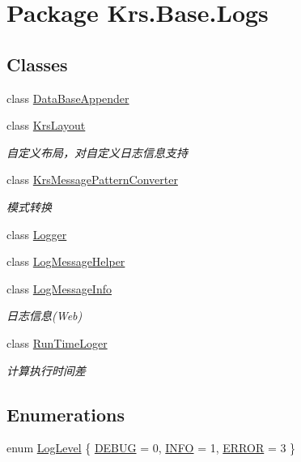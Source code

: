 \hypertarget{namespace_krs_1_1_base_1_1_logs}{\section{Package Krs.\-Base.\-Logs}
\label{namespace_krs_1_1_base_1_1_logs}
}
\subsection*{Classes}
\begin{DoxyCompactItemize}
\item 
class \hyperlink{class_krs_1_1_base_1_1_logs_1_1_data_base_appender}{Data\-Base\-Appender}
\item 
class \hyperlink{class_krs_1_1_base_1_1_logs_1_1_krs_layout}{Krs\-Layout}
\begin{DoxyCompactList}\small\item\em 自定义布局，对自定义日志信息支持 \end{DoxyCompactList}\item 
class \hyperlink{class_krs_1_1_base_1_1_logs_1_1_krs_message_pattern_converter}{Krs\-Message\-Pattern\-Converter}
\begin{DoxyCompactList}\small\item\em 模式转换 \end{DoxyCompactList}\item 
class \hyperlink{class_krs_1_1_base_1_1_logs_1_1_logger}{Logger}
\item 
class \hyperlink{class_krs_1_1_base_1_1_logs_1_1_log_message_helper}{Log\-Message\-Helper}
\item 
class \hyperlink{class_krs_1_1_base_1_1_logs_1_1_log_message_info}{Log\-Message\-Info}
\begin{DoxyCompactList}\small\item\em 日志信息(\-Web) \end{DoxyCompactList}\item 
class \hyperlink{class_krs_1_1_base_1_1_logs_1_1_run_time_loger}{Run\-Time\-Loger}
\begin{DoxyCompactList}\small\item\em 计算执行时间差 \end{DoxyCompactList}\end{DoxyCompactItemize}
\subsection*{Enumerations}
\begin{DoxyCompactItemize}
\item 
enum \hyperlink{namespace_krs_1_1_base_1_1_logs_aa1f948e33e410052b2716d8b68ec6583}{Log\-Level} \{ \hyperlink{namespace_krs_1_1_base_1_1_logs_aa1f948e33e410052b2716d8b68ec6583}{D\-E\-B\-U\-G} = 0, 
\hyperlink{namespace_krs_1_1_base_1_1_logs_aa1f948e33e410052b2716d8b68ec6583}{I\-N\-F\-O} = 1, 
\hyperlink{namespace_krs_1_1_base_1_1_logs_aa1f948e33e410052b2716d8b68ec6583}{E\-R\-R\-O\-R} = 3
 \}
\end{DoxyCompactItemize}


